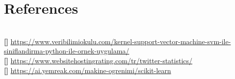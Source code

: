 \documentclass[onecolumn]{article}
\begin{document}
\section{References }
\\
\textbf{[]} \url{https://www.veribilimiokulu.com/kernel-support-vector-machine-svm-ile-siniflandirma-python-ile-ornek-uygulama/}
\\
\textbf{[]}  \url{https://www.websitehostingrating.com/tr/twitter-statistics/}
\\
 \textbf{[]} \url{https://ai.yemreak.com/makine-ogrenimi/scikit-learn}
\end{document}
